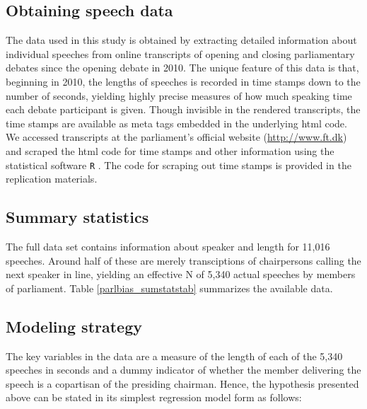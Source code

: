 \documentclass[12pt,a4paper]{article}
\begin{document}
\subsection{Obtaining speech data}
The data used in this study is obtained by extracting detailed information about individual speeches from online transcripts of opening and closing parliamentary debates since the opening debate in 2010. The unique feature of this data is that, beginning in 2010, the lengths of speeches is recorded in time stamps down to the number of seconds, yielding highly precise measures of how much speaking time each debate participant is given. Though invisible in the rendered transcripts, the time stamps are available as meta tags embedded in the underlying html code. We accessed transcripts at the parliament's official website (\url{http://www.ft.dk}) and scraped the html code for time stamps and other information using the statistical software \texttt{R} \citep{RDevelopmentCoreTeam2011}. The code for scraping out time stamps is provided in the replication materials.

\subsection{Summary statistics}
The full data set contains information about speaker and length for 11,016 speeches. Around half of these are merely transciptions of chairpersons calling the next speaker in line, yielding an effective N of 5,340 actual speeches by members of parliament. Table \ref{parlbias_sumstatstab} summarizes the available data.




\subsection{Modeling strategy}
The key variables in the data are a measure of the length of each of the 5,340 speeches in seconds and a dummy indicator of whether the member delivering the speech is a copartisan of the presiding chairman. Hence, the hypothesis presented above can be stated in its simplest regression model form as follows:
\end{document}
